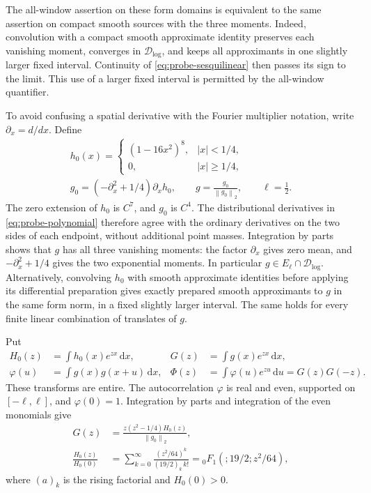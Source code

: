 \documentclass[11pt]{article}
\numberwithin{equation}{section}
\theoremstyle{definition}
\theoremstyle{remark}
\newcommand{\norm}[1]{\left\lVert #1\right\rVert}
\newcommand{\dd}{\,\mathrm d}
\begin{document}
The all-window assertion on these form domains is equivalent to the
same assertion on compact smooth sources with the three moments.
Indeed, convolution with a compact smooth approximate identity
preserves each vanishing moment, converges in \(\mathcal D_{\log}\),
and keeps all approximants in one slightly larger fixed interval.
Continuity of \eqref{eq:probe-sesquilinear} then passes its sign to the
limit. This use of a larger fixed interval is permitted by the
all-window quantifier.

To avoid confusing a spatial derivative with the Fourier multiplier
notation, write \(\partial_x=d/dx\). Define
\begin{equation}\label{eq:probe-polynomial}
\begin{gathered}
h_0(x)=
\begin{cases}(1-16x^2)^8,&|x|<1/4,\\0,&|x|\ge1/4,
\end{cases}
\\
g_0=(-\partial_x^2+1/4)\partial_xh_0,
\qquad g=\frac{g_0}{\norm{g_0}_2},\qquad \ell=\frac12.
\end{gathered}
\end{equation}
The zero extension of \(h_0\) is \(C^7\), and \(g_0\) is \(C^4\).
The distributional derivatives in \eqref{eq:probe-polynomial}
therefore agree with the ordinary derivatives on the two sides of
each endpoint, without additional point masses. Integration by parts
shows that \(g\) has all three vanishing moments: the factor
\(\partial_x\) gives zero mean, and
\(-\partial_x^2+1/4\) gives the two exponential moments.
In particular \(g\in E_\ell\cap\mathcal D_{\log}\).
Alternatively, convolving \(h_0\) with smooth approximate identities
before applying its differential preparation gives exactly prepared
smooth approximants to \(g\) in the same form norm, in a fixed
slightly larger interval. The same holds for every finite linear
combination of translates of \(g\).

Put
\begin{equation}\label{eq:probe-transforms}
\begin{aligned}
H_0(z)&=\int h_0(x)e^{zx}\dd x,
&G(z)&=\int g(x)e^{zx}\dd x,\\
\varphi(u)&=\int g(x)g(x+u)\dd x,
&\Phi(z)&=\int\varphi(u)e^{zu}\dd u=G(z)G(-z).
\end{aligned}
\end{equation}
These transforms are entire. The autocorrelation \(\varphi\) is real
and even, supported on \([-\ell,\ell]\), and \(\varphi(0)=1\).
Integration by parts and integration of the even monomials give
\begin{equation}\label{eq:probe-entire-formula}
\begin{aligned}
G(z)&=\frac{z(z^2-1/4)H_0(z)}{\norm{g_0}_2},\\
\frac{H_0(z)}{H_0(0)}
&=\sum_{k=0}^{\infty}
\frac{(z^2/64)^k}{(19/2)_k\,k!}
={}_0F_1\left(;19/2;z^2/64\right),
\end{aligned}
\end{equation}
where \((a)_k\) is the rising factorial and \(H_0(0)>0\).
\end{document}

